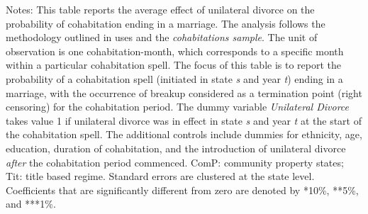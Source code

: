 \begin{table}[H]\centering                                  \scriptsize                                 \caption{The average effect of unilateral divorce on the probability that a cohabitation spell ends in a marriage by property regime at divorce. Unit of observation: cohabitation-month}                                   \label{tab:tabdurmcom}                                 
\begin{minipage}{\textwidth}
\scriptsize\smallskip
Notes: This table reports the average effect of unilateral divorce on the probability of cohabitation ending in a marriage. The analysis follows the methodology outlined in \cite{borusyak2021} uses and the \textit{cohabitations sample}. The unit of observation is one cohabitation-month, which corresponds to a specific month within a particular cohabitation spell. The focus of this table is to report the probability of a cohabitation spell (initiated in state \textit{s} and year \textit{t}) ending in a marriage, with the occurrence of breakup considered as a termination point (right censoring) for the cohabitation period. The dummy variable \textit{Unilateral Divorce} takes value 1 if unilateral divorce was in effect in state \textit{s} and year \textit{t} at the start of the cohabitation spell. The additional controls include dummies for ethnicity, age, education, duration of cohabitation, and the introduction of unilateral divorce \textit{after} the cohabitation period commenced. ComP: community property states; Tit: title based regime. Standard errors are clustered at the state level. Coefficients that are significantly different from zero are denoted by *10\%, **5\%, and ***1\%.
\\
\end{minipage}
\end{table}
